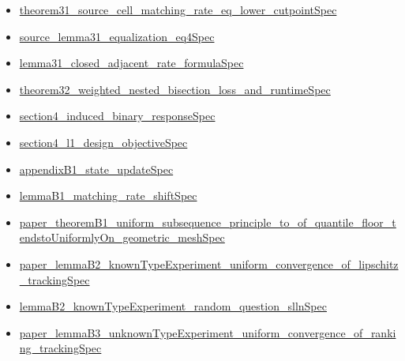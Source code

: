 \documentclass[10pt]{article}
\begin{document}
\begin{itemize}[leftmargin=1.2em]
\begin{itemize}[leftmargin=1.2em]
\item \hyperlink{source-claim-50a2d9627ea4a9d0}{theorem31\_\allowbreak{}source\_\allowbreak{}cell\_\allowbreak{}matching\_\allowbreak{}rate\_\allowbreak{}eq\_\allowbreak{}lower\_\allowbreak{}cutpoint\allowbreak{}Spec}
\item \hyperlink{source-claim-d2fd3442bfa83879}{source\_\allowbreak{}lemma31\_\allowbreak{}equalization\_\allowbreak{}eq4\allowbreak{}Spec}
\item \hyperlink{source-claim-e679d8fd634fddb9}{lemma31\_\allowbreak{}closed\_\allowbreak{}adjacent\_\allowbreak{}rate\_\allowbreak{}formula\allowbreak{}Spec}
\item \hyperlink{source-claim-9c02a19f4b41b0c2}{theorem32\_\allowbreak{}weighted\_\allowbreak{}nested\_\allowbreak{}bisection\_\allowbreak{}loss\_\allowbreak{}and\_\allowbreak{}runtime\allowbreak{}Spec}
\item \hyperlink{source-claim-a5f9ed46c3edb5c1}{section4\_\allowbreak{}induced\_\allowbreak{}binary\_\allowbreak{}response\allowbreak{}Spec}
\item \hyperlink{source-claim-3fed172202fb05fc}{section4\_\allowbreak{}l1\_\allowbreak{}design\_\allowbreak{}objective\allowbreak{}Spec}
\item \hyperlink{source-claim-6724e8b8f279b968}{appendix\allowbreak{}B1\_\allowbreak{}state\_\allowbreak{}update\allowbreak{}Spec}
\item \hyperlink{source-claim-52ebae870dd67c82}{lemma\allowbreak{}B1\_\allowbreak{}matching\_\allowbreak{}rate\_\allowbreak{}shift\allowbreak{}Spec}
\item \hyperlink{source-claim-5249ffde05e3b08f}{paper\_\allowbreak{}theorem\allowbreak{}B1\_\allowbreak{}uniform\_\allowbreak{}subsequence\_\allowbreak{}principle\_\allowbreak{}to\_\allowbreak{}of\_\allowbreak{}quantile\_\allowbreak{}floor\_\allowbreak{}tendsto\allowbreak{}Uniformly\allowbreak{}On\_\allowbreak{}geometric\_\allowbreak{}mesh\allowbreak{}Spec}
\item \hyperlink{source-claim-276fd5feab006dec}{paper\_\allowbreak{}lemma\allowbreak{}B2\_\allowbreak{}known\allowbreak{}Type\allowbreak{}Experiment\_\allowbreak{}uniform\_\allowbreak{}convergence\_\allowbreak{}of\_\allowbreak{}lipschitz\_\allowbreak{}tracking\allowbreak{}Spec}
\item \hyperlink{source-claim-76b42fc11ca5198e}{lemma\allowbreak{}B2\_\allowbreak{}known\allowbreak{}Type\allowbreak{}Experiment\_\allowbreak{}random\_\allowbreak{}question\_\allowbreak{}slln\allowbreak{}Spec}
\item \hyperlink{source-claim-045f11cd1b489b98}{paper\_\allowbreak{}lemma\allowbreak{}B3\_\allowbreak{}unknown\allowbreak{}Type\allowbreak{}Experiment\_\allowbreak{}uniform\_\allowbreak{}convergence\_\allowbreak{}of\_\allowbreak{}ranking\_\allowbreak{}tracking\allowbreak{}Spec}

\end{itemize}
\end{itemize}
\end{document}
